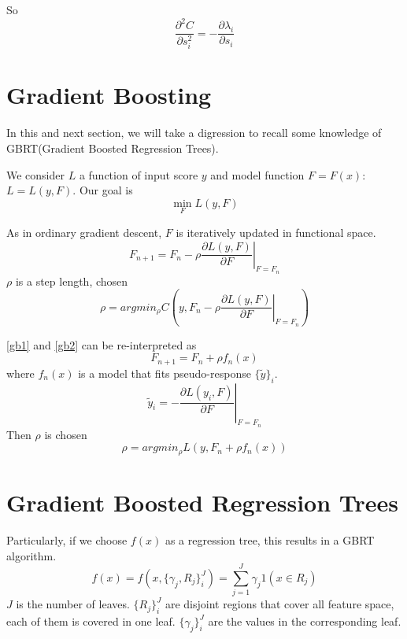 \documentclass [11pt,a4paper]{article}
\begin{document}
So
\begin{equation}
\label{dd}
\frac{\partial^2 C}{\partial s_i^2}
= - \frac{\partial \lambda_i}{\partial s_i}
\end{equation}


\section{Gradient Boosting}
In this and next section,
we will take a digression to recall some knowledge of GBRT(Gradient Boosted Regression Trees).


We consider $L$ a function of input score $y$ and model function $F=F(x)$: $L = L(y, F)$.
Our goal is
\begin{equation}
\min_{F} L(y, F)
\end{equation}


As in ordinary gradient descent, $F$ is iteratively updated in functional space.
\begin{equation}
\label{gb1}
F_{n+1} = F_n - \rho \left.\frac{\partial L(y, F)}{\partial F}\right|_{F=F_n}
\end{equation}
$\rho$ is a step length, chosen
\begin{equation}
\label{gb2}
\rho = argmin_{\rho} C\left(y, F_n - \rho \left.\frac{\partial L(y, F)}{\partial F}\right|_{F=F_n}\right)
\end{equation}


\ref{gb1} and \ref{gb2} can be re-interpreted as
\begin{equation}
F_{n+1} = F_n + \rho f_n(x)
\end{equation}
where $f_n(x)$ is a model that fits pseudo-response $\{\widetilde{y}\}_i$.
\begin{equation}
\widetilde{y}_i = - \left.\frac{\partial L(y_i, F)}{\partial F}\right|_{F=F_n}
\end{equation}
Then $\rho$ is chosen
\begin{equation}
\rho = argmin_{\rho} L(y, F_n + \rho f_n(x))
\end{equation}


\section{Gradient Boosted Regression Trees}\label{gbrt}
Particularly, if we choose $f(x)$ as a regression tree,
this results in a GBRT algorithm.
\begin{equation}
f(x) = f(x, \{\gamma_j, R_j\}_i^J) = \sum_{j=1}^{J}\gamma_j 1(x \in R_j)
\end{equation}
$J$ is the number of leaves.
$\{R_j\}_i^J$ are disjoint regions that cover all feature space, each of them is covered in one leaf.
$\{\gamma_j\}_i^J$ are the values in the corresponding leaf.
\end{document}
